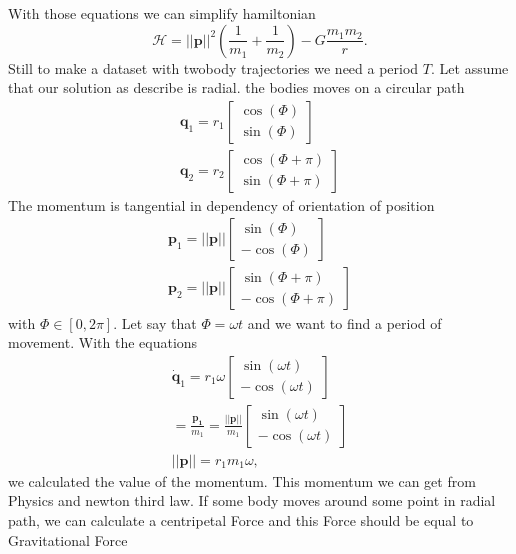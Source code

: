 With those equations we can simplify hamiltonian \begin{equation}
	\mathcal{H}= ||\mathbf{p}||^2\left(\frac{1}{m_1}+\frac{1}{m_2}\right) - G\frac{m_1m_2}{r}.
\end{equation}
Still to make a dataset with twobody trajectories we need a period $T$. Let assume that our solution as describe is radial. the bodies moves on a circular path
\begin{eqnarray}
	\mathbf{q}_1 = r_1
	\begin{bmatrix}
		\cos(\Phi)\\
		\sin(\Phi)
	\end{bmatrix}\\
\mathbf{q}_2 = r_2
\begin{bmatrix}
	\cos(\Phi+ \pi)\\
	\sin(\Phi+ \pi)
\end{bmatrix}
\end{eqnarray}
The momentum is tangential in dependency of orientation of position
\begin{eqnarray}
	\mathbf{p}_1 = ||\mathbf{p}||
	\begin{bmatrix}
		\sin(\Phi)\\
		-\cos(\Phi)
	\end{bmatrix}\\
	\mathbf{p}_2 = ||\mathbf{p}||
	\begin{bmatrix}
		\sin(\Phi+ \pi)\\
		-\cos(\Phi+ \pi)
	\end{bmatrix}
\end{eqnarray} with $\Phi \in [0,2\pi] $.
Let say that $\Phi=\omega t$
and we want to find a period of movement.
With the equations
\begin{eqnarray}
	\dot{\mathbf{q}}_1 = r_1\omega
	\begin{bmatrix}
		\sin(\omega t)\\
		-\cos(\omega t)
	\end{bmatrix}\\ = \frac{\mathbf{p_1}}{m_1} = \frac{||\mathbf{p}||}{m_1}\begin{bmatrix}
	\sin(\omega t)\\
	-\cos(\omega t)
\end{bmatrix}\\
||\mathbf{p}|| = r_1m_1\omega,
\end{eqnarray}
we calculated the value of the momentum.
This momentum we can get from Physics and newton third law. If some body moves around some point in radial path, we can calculate a centripetal Force and this Force should be equal to Gravitational Force
